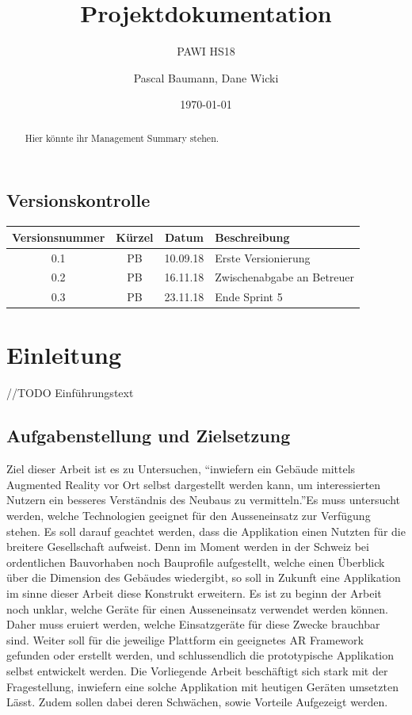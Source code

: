 \documentclass[a4paper]{scrreprt}
\title{Projektdokumentation}
\subtitle{PAWI HS18}
\author{Pascal Baumann, Dane Wicki}
\date{\today}
\begin{document}
\begin{titlepage}
\maketitle
\end{titlepage}

\renewcommand{\abstractname}{Management Summary}
\begin{abstract}
	Hier könnte ihr Management Summary stehen.
\end{abstract}

\section*{Versionskontrolle}

\begin{tabularx}{\textwidth}{|c|c|c|X|}
	\hline
	\textbf{Versionsnummer} & \textbf{Kürzel} & \textbf{Datum} & \textbf{Beschreibung} \\
	\hline
	0.1 & PB & 10.09.18 & Erste Versionierung \\
	\hline
	0.2 & PB & 16.11.18 & Zwischenabgabe an Betreuer \\
	\hline
	0.3 & PB & 23.11.18 & Ende Sprint 5\\
	\hline
\end{tabularx}

\tableofcontents

\clearpage
{}
\chapter{Einleitung}
//TODO Einführungstext

\section{Aufgabenstellung und Zielsetzung}
Ziel dieser Arbeit ist es zu Untersuchen, \textquotedblleft inwiefern ein Gebäude mittels Augmented Reality vor Ort selbst dargestellt werden kann, um interessierten Nutzern ein besseres Verständnis des Neubaus zu vermitteln.\textquotedblright Es muss untersucht werden, welche Technologien geeignet für den Ausseneinsatz zur Verfügung stehen. Es soll darauf geachtet werden, dass die Applikation einen Nutzten für die breitere Gesellschaft aufweist. Denn im Moment werden in der Schweiz bei ordentlichen Bauvorhaben noch Bauprofile aufgestellt, welche einen Überblick über die Dimension des Gebäudes wiedergibt, so soll in Zukunft eine Applikation im sinne dieser Arbeit diese Konstrukt erweitern.
\bigbreak
Es ist zu beginn der Arbeit noch unklar, welche Geräte für einen Ausseneinsatz verwendet werden können. Daher muss eruiert werden, welche Einsatzgeräte für diese Zwecke brauchbar sind. Weiter soll für die jeweilige Plattform ein geeignetes AR Framework gefunden oder erstellt werden, und schlussendlich die prototypische Applikation selbst entwickelt werden.
\bigbreak
Die Vorliegende Arbeit beschäftigt sich stark mit der Fragestellung, inwiefern eine solche Applikation mit heutigen Geräten umsetzten Lässt. Zudem sollen dabei deren Schwächen, sowie Vorteile Aufgezeigt werden.
\end{document}
